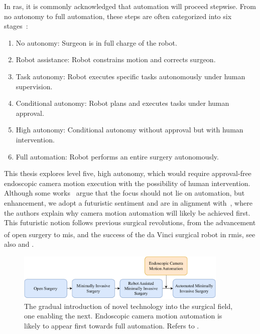 In \gls{ras}, it is commonly acknowledged that automation will proceed stepwise. From no autonomy to full automation, these steps are often categorized into six stages~\cite{zhang2017automation, fosch2021human}:
\begin{enumerate}
    \item No autonomy: Surgeon is in full charge of the robot.
    \item Robot assistance: Robot constrains motion and corrects surgeon.  
    \item Task autonomy: Robot executes specific tasks autonomously under human supervision.
    \item Conditional autonomy: Robot plans and executes tasks under human approval.
    \item High autonomy: Conditional autonomy without approval but with human intervention.
    \item Full automation: Robot performs an entire surgery autonomously.
\end{enumerate}
This thesis explores level five, high autonomy, which would require approval-free endoscopic camera motion execution with the possibility of human intervention. Although some works~\cite{battaglia2021rethinking} argue that the focus should not lie on automation, but enhancement, we adopt a futuristic sentiment and are in alignment with~\cite{kitaguchi2022artificial}, where the authors explain why camera motion automation will likely be achieved first. This futuristic notion follows previous surgical revolutions, from the advancement of open surgery to \gls{mis}, and the success of the da Vinci\textsuperscript{\textregistered} surgical robot in \gls{rmis}, see also  and .
\begin{figure}[htb]
    \centering
    \includegraphics[width=0.9\textwidth]{introduction/fig/24_02_13_surgical_revolution.pdf}
    \caption{The gradual introduction of novel technology into the surgical field, one enabling the next. Endoscopic camera motion automation is likely to appear first towards full automation. Refers to .}
    \label{in:fig:camera_motion_automation}
\end{figure}

